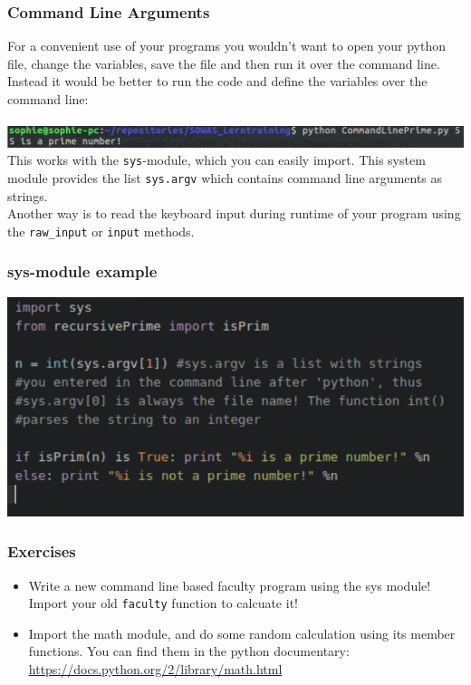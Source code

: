 \documentclass{beamer}
\begin{document}
\begin{frame}
\frametitle{Command Line Arguments}
	For a convenient use of your programs you wouldn't want to open your python file, change the variables, save the file and then run it over the command line. Instead it would be better to run the code and define the variables over the command line: \\ $\,$ \\
	\includegraphics[width = 1\textwidth]{CommandLinePrime.pdf} \\
	This works with the \texttt{sys}-module, which you can easily import. This system module provides the list \texttt{sys.argv} which contains command line arguments as strings. \\ Another way is to read the keyboard input during runtime of your program using the \texttt{raw\_input} or \texttt{input} methods.
\end{frame}


\begin{frame}
\frametitle{sys-module example}
	\includegraphics[width = 1\textwidth]{SysExample.pdf} 
\end{frame}


\begin{frame}
\frametitle{Exercises}
	\begin{itemize}
		\item Write a new command line based faculty program using the sys module! Import your old \texttt{faculty} function to calcuate it!
		\item Import the math module, and do some random calculation using its member functions. You can find them in the python documentary: \url{https://docs.python.org/2/library/math.html}
	\end{itemize}
\end{frame}
\end{document}
